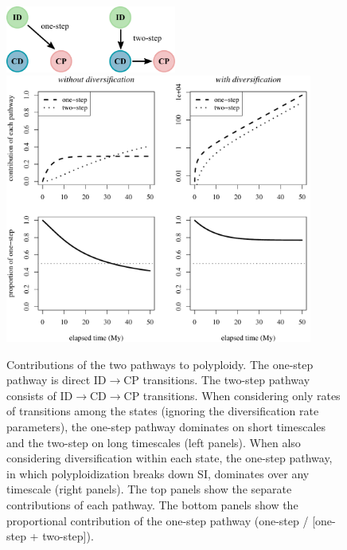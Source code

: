 \begin{figure}
    \centering 
    \includegraphics[width=0.5\textwidth]{fig4a} \\ [40pt] 
        \includegraphics[width=0.9\textwidth]{fig4b}
    \caption{
        Contributions of the two pathways to polyploidy.
        The one-step pathway is direct ID$\rightarrow$CP transitions.
        The two-step pathway consists of ID$\rightarrow$CD$\rightarrow$CP transitions.
        When considering only rates of transitions among the states (ignoring the diversification rate parameters), the one-step pathway dominates on short timescales and the two-step on long timescales (left panels).
        When also considering diversification within each state, the one-step pathway, in which polyploidization breaks down SI, dominates over any timescale (right panels).
        The top panels show the separate contributions of each pathway.
        The bottom panels show the proportional contribution of the one-step pathway (\ie one-step / [one-step + two-step]).
    }
    \label{figure:pathways}
\end{figure}


